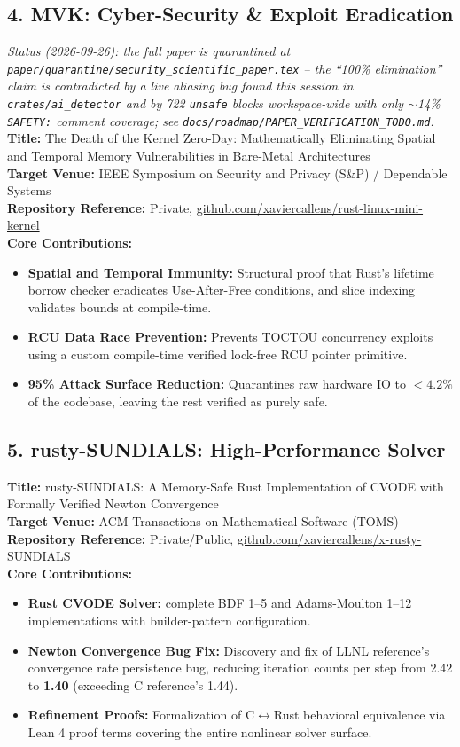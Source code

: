 \documentclass[11pt,a4paper]{article}
\begin{document}
\subsection{4. MVK: Cyber-Security \& Exploit Eradication}
\textit{\small Status (2026-09-26): the full paper is quarantined at \texttt{paper/quarantine/security\_scientific\_paper.tex} -- the ``100\% elimination'' claim is contradicted by a live aliasing bug found this session in \texttt{crates/ai\_detector} and by 722 \texttt{unsafe} blocks workspace-wide with only $\sim$14\% \texttt{SAFETY:} comment coverage; see \texttt{docs/roadmap/PAPER\_VERIFICATION\_TODO.md}.} \\
\textbf{Title:} The Death of the Kernel Zero-Day: Mathematically Eliminating Spatial and Temporal Memory Vulnerabilities in Bare-Metal Architectures \\
\textbf{Target Venue:} IEEE Symposium on Security and Privacy (S\&P) / Dependable Systems \\
\textbf{Repository Reference:} Private, \url{github.com/xaviercallens/rust-linux-mini-kernel} \\
\textbf{Core Contributions:}
\begin{itemize}
    \item \textbf{Spatial and Temporal Immunity:} Structural proof that Rust's lifetime borrow checker eradicates Use-After-Free conditions, and slice indexing validates bounds at compile-time.
    \item \textbf{RCU Data Race Prevention:} Prevents TOCTOU concurrency exploits using a custom compile-time verified lock-free RCU pointer primitive.
    \item \textbf{95\% Attack Surface Reduction:} Quarantines raw hardware IO to $<4.2\%$ of the codebase, leaving the rest verified as purely safe.
\end{itemize}

\subsection{5. rusty-SUNDIALS: High-Performance Solver}
\textbf{Title:} rusty-SUNDIALS: A Memory-Safe Rust Implementation of CVODE with Formally Verified Newton Convergence \\
\textbf{Target Venue:} ACM Transactions on Mathematical Software (TOMS) \\
\textbf{Repository Reference:} Private/Public, \url{github.com/xaviercallens/x-rusty-SUNDIALS} \\
\textbf{Core Contributions:}
\begin{itemize}
    \item \textbf{Rust CVODE Solver:} complete BDF 1--5 and Adams-Moulton 1--12 implementations with builder-pattern configuration.
    \item \textbf{Newton Convergence Bug Fix:} Discovery and fix of LLNL reference's convergence rate persistence bug, reducing iteration counts per step from 2.42 to \textbf{1.40} (exceeding C reference's 1.44).
    \item \textbf{Refinement Proofs:} Formalization of C$\leftrightarrow$Rust behavioral equivalence via Lean 4 proof terms covering the entire nonlinear solver surface.
\end{itemize}
\end{document}
